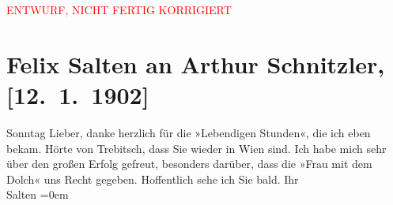 
\begin{center}
            \textcolor{red}{ENTWURF, NICHT FERTIG KORRIGIERT}
                      \end{center}
            
         
         \renewcommand{\erwaehntePersonen}{Personen: Siegfried Trebitsch}
         \renewcommand{\erwaehnteOrte}{Orte: Wien}
         \renewcommand{\erwaehnteWerke}{Werke: Die Frau mit dem Dolche, Lebendige Stunden. Vier Einakter}
               \section[Felix Salten an Arthur Schnitzler, {[}12. 1. 1902{]}]{ Felix Salten an Arthur Schnitzler, {[}12. 1. 1902{]}}\nopagebreak{}\rehead{ }\begin{ledgroupsized}[t]{13cm}\normalsize\beginnumbering \toendnotes[C]{\smallbreak\pagebreak[2]} 
\pstart
           \raggedleft{}{\pb}Sonntag\pend
           \pstart
           Lieber, danke herzlich für die »Lebendigen Stunden«, die ich eben bekam. Hörte von Trebitsch, dass Sie wieder in Wien sind. Ich habe mich sehr über den großen Erfolg gefreut, besonders
               darüber, dass die »Frau mit dem Dolch« uns Recht
               gegeben. Hoffentlich sehe ich Sie bald.\pend
           \pstart
           Ihr {\\[\baselineskip]}\spacefill\mbox{Salten}\pend
           \leftskip=0em{}
         
         \endnumbering{}\end{ledgroupsized}\begin{anhang}\end{anhang}\newcommand{\dateiname}{L03322}\newcommand{\titel}{Felix Salten an Arthur Schnitzler, [12. 1. 1902]}\newcommand{\editorInnen}{Martin Anton Müller und Laura Untner}
      